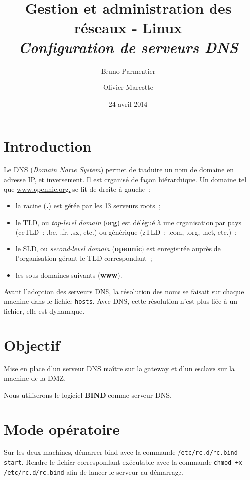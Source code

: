 \documentclass[11pt,a4paper,oneside]{article}
\author{Bruno Parmentier \and Olivier Marcotte}
\title{Gestion et administration des réseaux - Linux \\[1cm] \emph{Configuration
de serveurs DNS}}
\date{24 avril 2014}
\newcommand{\inlinecode}{\lstinline[breaklines=true]}
\begin{document}
\begin{titlepage}
    \maketitle
    \thispagestyle{empty}
\end{titlepage}

\section{Introduction}
Le DNS (\emph{Domain Name System}) permet de traduire un nom de domaine en
adresse IP, et inversement. Il est organisé de façon hiérarchique. Un domaine
tel que \url{www.opennic.org.} se lit de droite à gauche~:
\begin{itemize}
    \item la racine (\textbf{.}) est gérée par les 13 serveurs roots~;
    \item le TLD, ou \emph{top-level domain} (\textbf{org}) est délégué à une
        organisation par pays (ccTLD~: .be, .fr, .sx, etc.) ou générique (gTLD~:
        .com, .org, .net, etc.)~;
    \item le SLD, ou \emph{second-level domain} (\textbf{opennic}) est
        enregistrée auprès de l'organisation gérant le TLD correspondant~;
    \item les sous-domaines suivants (\textbf{www}).
\end{itemize}

Avant l'adoption des serveurs DNS, la résolution des noms se faisait sur chaque
machine dans le fichier \inlinecode{hosts}. Avec DNS, cette résolution n'est
plus liée à un fichier, elle est dynamique.

\section{Objectif}
Mise en place d'un serveur DNS maître sur la gateway et d'un esclave sur la
machine de la DMZ.

Nous utiliserons le logiciel \textbf{BIND} comme serveur DNS.

\section{Mode opératoire}

Sur les deux machines, démarrer bind avec la commande
\inlinecode{/etc/rc.d/rc.bind start}. Rendre le fichier correspondant exécutable
avec la commande \inlinecode{chmod +x /etc/rc.d/rc.bind} afin de lancer le
serveur au démarrage.
\end{document}
